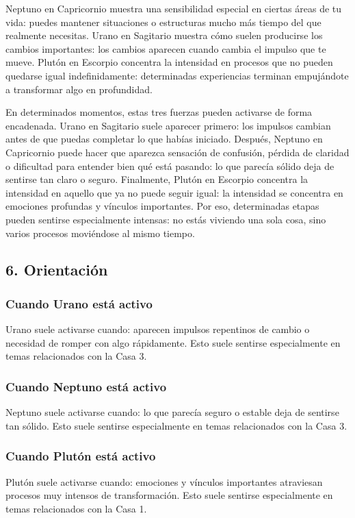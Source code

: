 \documentclass[11pt,a4paper]{article}
\begin{document}
Neptuno en Capricornio muestra una sensibilidad especial en ciertas áreas de tu vida: puedes mantener situaciones o estructuras mucho más tiempo del que realmente necesitas. Urano en Sagitario muestra cómo suelen producirse los cambios importantes: los cambios aparecen cuando cambia el impulso que te mueve. Plutón en Escorpio concentra la intensidad en procesos que no pueden quedarse igual indefinidamente: determinadas experiencias terminan empujándote a transformar algo en profundidad.

En determinados momentos, estas tres fuerzas pueden activarse de forma encadenada. Urano en Sagitario suele aparecer primero: los impulsos cambian antes de que puedas completar lo que habías iniciado. Después, Neptuno en Capricornio puede hacer que aparezca sensación de confusión, pérdida de claridad o dificultad para entender bien qué está pasando: lo que parecía sólido deja de sentirse tan claro o seguro. Finalmente, Plutón en Escorpio concentra la intensidad en aquello que ya no puede seguir igual: la intensidad se concentra en emociones profundas y vínculos importantes. Por eso, determinadas etapas pueden sentirse especialmente intensas: no estás viviendo una sola cosa, sino varios procesos moviéndose al mismo tiempo.

\vspace{0.8cm}

\subsection{6. Orientación}

\subsubsection*{Cuando Urano está activo}
Urano suele activarse cuando: aparecen impulsos repentinos de cambio o necesidad de romper con algo rápidamente. Esto suele sentirse especialmente en temas relacionados con la Casa 3.

\subsubsection*{Cuando Neptuno está activo}
Neptuno suele activarse cuando: lo que parecía seguro o estable deja de sentirse tan sólido. Esto suele sentirse especialmente en temas relacionados con la Casa 3.

\subsubsection*{Cuando Plutón está activo}
Plutón suele activarse cuando: emociones y vínculos importantes atraviesan procesos muy intensos de transformación. Esto suele sentirse especialmente en temas relacionados con la Casa 1.
\end{document}
